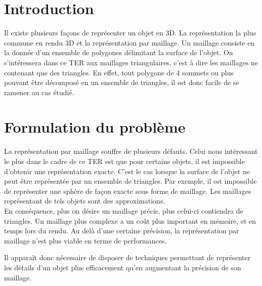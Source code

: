 \section{Introduction}
Il existe plusieurs façons de représenter un objet en 3D. La représentation la plus commune en rendu 3D et la représentation
par maillage. Un maillage consiste en la donnée d'un ensemble de polygones délimitant la surface de l'objet. On s'intéressera dans ce TER aux maillages
triangulaires, c'est à dire les maillages ne contenant que des triangles. En effet, tout polygone de 4 sommets ou plus pouvant être décomposé en un
ensemble de triangles, il est donc facile de se ramener au cas étudié.\\

\section{Formulation du problème}
La représentation par maillage souffre de plusieurs défauts. Celui nous intéressant le plus dans le cadre de ce TER est que pour certains objets,
il est impossible d'obtenir une représentation exacte. C'est le cas lorsque la surface de l'objet ne peut être représentée par un ensemble de triangles.
Par exemple, il est impossible de représenter une sphère de façon exacte sous forme de maillage. Les maillages représentant de tels objets sont des
approximations.\\
En conséquence, plus on désire un maillage précis, plus celui-ci contiendra de triangles. Un maillage plus complexe a un coût
plus important en mémoire, et en temps lors du rendu. Au delà d'une certaine précision, la représentation par maillage n'est plus viable
en terme de performances. 


Il apparaît donc nécessaire de disposer de techniques permettant de représenter les détails d'un objet plus
efficacement qu'en augmentant la précision de son maillage.
